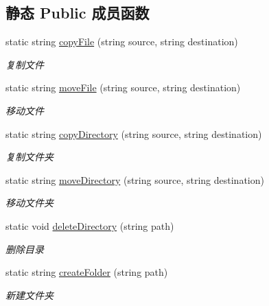 \subsection*{静态 Public 成员函数}
\begin{DoxyCompactItemize}
\item 
static string \hyperlink{classcustom__cloud_1_1_file_tree_ab0da00e712692d0422c972b20dd3e214}{copy\+File} (string source, string destination)
\begin{DoxyCompactList}\small\item\em 复制文件 \end{DoxyCompactList}\item 
static string \hyperlink{classcustom__cloud_1_1_file_tree_ac36e502bbb41d66b40d0ee2d6f291e33}{move\+File} (string source, string destination)
\begin{DoxyCompactList}\small\item\em 移动文件 \end{DoxyCompactList}\item 
static string \hyperlink{classcustom__cloud_1_1_file_tree_a240dc4bf56ff3db7b5be500f9e0c72f0}{copy\+Directory} (string source, string destination)
\begin{DoxyCompactList}\small\item\em 复制文件夹 \end{DoxyCompactList}\item 
static string \hyperlink{classcustom__cloud_1_1_file_tree_a42f07545063f1300dafcc59005edd9e1}{move\+Directory} (string source, string destination)
\begin{DoxyCompactList}\small\item\em 移动文件夹 \end{DoxyCompactList}\item 
static void \hyperlink{classcustom__cloud_1_1_file_tree_ac14fe3a408f761bd71ebcde7d3605053}{delete\+Directory} (string path)
\begin{DoxyCompactList}\small\item\em 删除目录 \end{DoxyCompactList}\item 
static string \hyperlink{classcustom__cloud_1_1_file_tree_ade3ba6237741e061490d01a70d6dd163}{create\+Folder} (string path)
\begin{DoxyCompactList}\small\item\em 新建文件夹 \end{DoxyCompactList}\end{DoxyCompactItemize}
